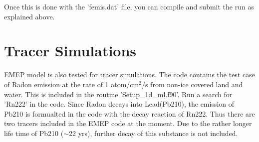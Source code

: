 Once this is done with the 'femis.dat' file, you can compile and
submit the run as explained above.   

\section{Tracer Simulations}

EMEP model is also tested for tracer simulations.  The code contains
the test case of Radon emission at the rate of 1 atom/cm$^{2}$/s from non-ice
covered land and water.  This is included in the routine
'Setup\_1d\_ml.f90'.  Run a search for 'Rn222' in the code.  Since Radon
decays into Lead(Pb210), the emission of Pb210 is formualted in the
code with the decay reaction of Rn222.  Thus there are two tracers
included in the EMEP code at the moment.  Due to the rather longer
life time of Pb210 (${\sim}$22 yrs), further decay of this substance is not
included.   
